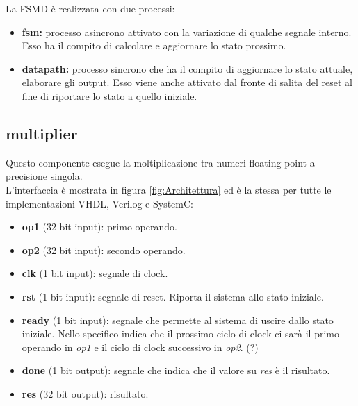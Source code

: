 \documentclass[]{IEEEtran}
\begin{document}
La FSMD è realizzata con due processi:
\begin{itemize}
    \item \textbf{fsm:} processo asincrono attivato con la variazione di qualche segnale interno. Esso ha il compito di calcolare e aggiornare lo stato prossimo.
    \item \textbf{datapath:} processo sincrono che ha il compito di aggiornare lo stato attuale, elaborare gli output. Esso viene anche attivato dal fronte di salita del reset al fine di riportare lo stato a quello iniziale.
\end{itemize}


\subsection{multiplier}
Questo componente esegue la moltiplicazione tra numeri floating point a precisione singola.
\\L'interfaccia è mostrata in figura \ref{fig:Architettura} ed è la stessa per tutte le implementazioni VHDL, Verilog e SystemC: 
\begin{itemize}
    \item \textbf{op1} (32 bit input): primo operando.
    \item \textbf{op2} (32 bit input): secondo operando.
    \item \textbf{clk} (1 bit input): segnale di clock.
    \item \textbf{rst} (1 bit input): segnale di reset. Riporta il sistema allo stato iniziale.
    \item \textbf{ready} (1 bit input): segnale che permette al sistema di uscire dallo stato iniziale. Nello specifico indica che il prossimo ciclo di clock ci sarà il primo operando in \textit{op1} e il ciclo di clock successivo in \textit{op2}. (?)
    \item \textbf{done} (1 bit output): segnale che indica che il valore su \textit{res} è il risultato.
    \item \textbf{res} (32 bit output): risultato.
\end{itemize}
    
\end{document}
